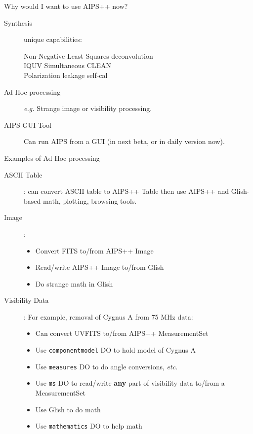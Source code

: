 \begin{slide}{Why would I want to use AIPS++ now?}
\begin{description}
\item[Synthesis] unique capabilities:
\begin{description}
\item[Non-Negative Least Squares deconvolution]
\item[IQUV Simultaneous CLEAN]
\item[Polarization leakage self-cal]
\end{description}
\item[Ad Hoc processing] {\em e.g.} Strange image or visibility
processing.
\item[AIPS GUI Tool] Can run AIPS from a GUI (in next beta, or in daily
version now).
\end{description}
\end{slide}

\begin{slide}{Examples of Ad Hoc processing}
\begin{description}
\item[ASCII Table]: can convert ASCII table to AIPS++ Table then
use AIPS++ and Glish-based math, plotting, browsing tools.
\item[Image]:
\begin{itemize}
\item Convert FITS to/from AIPS++ Image
\item Read/write AIPS++ Image to/from Glish
\item Do strange math in Glish
\end{itemize}
\item[Visibility Data]: For example, removal of Cygnus A from
75 MHz data:
\begin{itemize}
\item Can convert UVFITS to/from AIPS++ MeasurementSet
\item Use {\tt componentmodel} DO to hold model of Cygnus A
\item Use {\tt measures} DO to do angle conversions, {\em etc.}
\item Use {\tt ms} DO to read/write {\bf any} part of visibility
data to/from a MeasurementSet
\item Use Glish to do math
\item Use {\tt mathematics} DO to help math
\end{itemize}
\end{description}
\end{slide}

